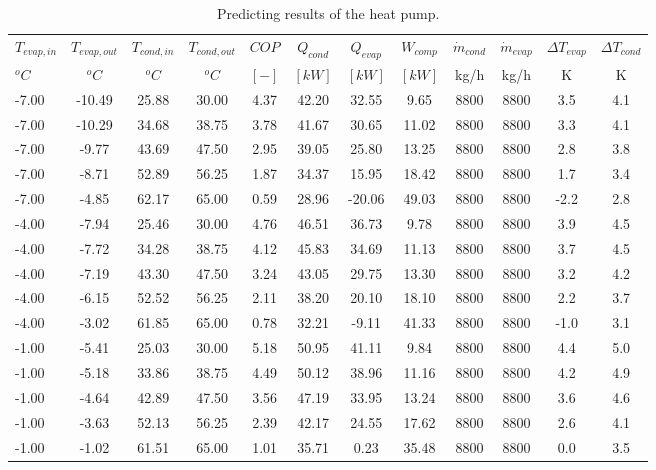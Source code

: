 \documentclass[english]{SPFShortReport}
\begin{document}
\begin{table}[!ht]
\begin{small}
\caption{Predicting results of the heat pump.}
\begin{center}
\resizebox{12cm}{!} 
{
\begin{tabular}{l | c c c c c c c c c c c } 
\hline
\hline
$T_{evap,in}$ &$T_{evap,out}$ &$T_{cond,in}$ &$T_{cond,out}$ &$COP$ &$Q_{cond}$ &$Q_{evap}$ &$W_{comp}$ &$\dot m_{cond}$ &$\dot m_{evap}$ &$\Delta T_{evap}$ &$\Delta T_{cond}$ \\ 
$^oC$ &$^oC$ &$^oC$ &$^oC$ &$[-]$ &$[kW]$ &$[kW]$ &$[kW]$ &kg/h &kg/h &K &K\\ 
\hline
-7.00 & -10.49 & 25.88 & 30.00 & 4.37 & 42.20 & 32.55 & 9.65 & 8800 & 8800 & 3.5 & 4.1\\ 
-7.00 & -10.29 & 34.68 & 38.75 & 3.78 & 41.67 & 30.65 & 11.02 & 8800 & 8800 & 3.3 & 4.1\\ 
-7.00 & -9.77 & 43.69 & 47.50 & 2.95 & 39.05 & 25.80 & 13.25 & 8800 & 8800 & 2.8 & 3.8\\ 
-7.00 & -8.71 & 52.89 & 56.25 & 1.87 & 34.37 & 15.95 & 18.42 & 8800 & 8800 & 1.7 & 3.4\\ 
-7.00 & -4.85 & 62.17 & 65.00 & 0.59 & 28.96 & -20.06 & 49.03 & 8800 & 8800 & -2.2 & 2.8\\ 
-4.00 & -7.94 & 25.46 & 30.00 & 4.76 & 46.51 & 36.73 & 9.78 & 8800 & 8800 & 3.9 & 4.5\\ 
-4.00 & -7.72 & 34.28 & 38.75 & 4.12 & 45.83 & 34.69 & 11.13 & 8800 & 8800 & 3.7 & 4.5\\ 
-4.00 & -7.19 & 43.30 & 47.50 & 3.24 & 43.05 & 29.75 & 13.30 & 8800 & 8800 & 3.2 & 4.2\\ 
-4.00 & -6.15 & 52.52 & 56.25 & 2.11 & 38.20 & 20.10 & 18.10 & 8800 & 8800 & 2.2 & 3.7\\ 
-4.00 & -3.02 & 61.85 & 65.00 & 0.78 & 32.21 & -9.11 & 41.33 & 8800 & 8800 & -1.0 & 3.1\\ 
-1.00 & -5.41 & 25.03 & 30.00 & 5.18 & 50.95 & 41.11 & 9.84 & 8800 & 8800 & 4.4 & 5.0\\ 
-1.00 & -5.18 & 33.86 & 38.75 & 4.49 & 50.12 & 38.96 & 11.16 & 8800 & 8800 & 4.2 & 4.9\\ 
-1.00 & -4.64 & 42.89 & 47.50 & 3.56 & 47.19 & 33.95 & 13.24 & 8800 & 8800 & 3.6 & 4.6\\ 
-1.00 & -3.63 & 52.13 & 56.25 & 2.39 & 42.17 & 24.55 & 17.62 & 8800 & 8800 & 2.6 & 4.1\\ 
-1.00 & -1.02 & 61.51 & 65.00 & 1.01 & 35.71 & 0.23 & 35.48 & 8800 & 8800 & 0.0 & 3.5\\ 

\end{tabular}}
\end{center}
\end{small}
\end{table}
\end{document}
